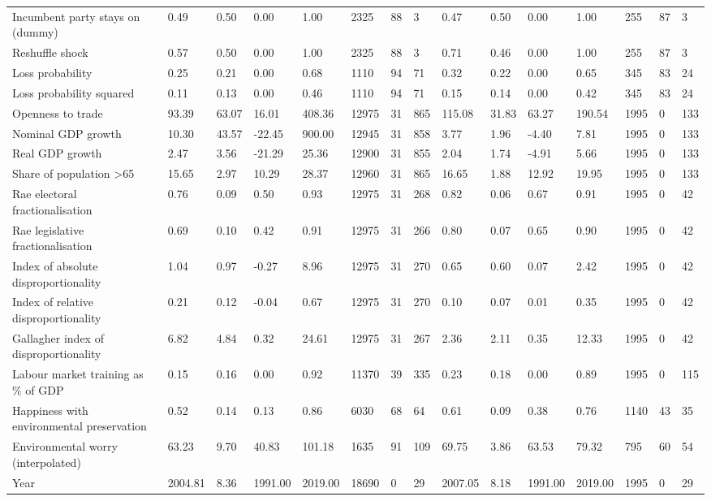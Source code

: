 \begin{longtable}{lllllllllllllll}
Incumbent party stays on (dummy) & 0.49 & 0.50 & 0.00 & 1.00 & 2325 & 88 & 3 & 0.47 & 0.50 & 0.00 & 1.00 & 255 & 87 & 3\\
Reshuffle shock & 0.57 & 0.50 & 0.00 & 1.00 & 2325 & 88 & 3 & 0.71 & 0.46 & 0.00 & 1.00 & 255 & 87 & 3\\
\addlinespace
Loss probability & 0.25 & 0.21 & 0.00 & 0.68 & 1110 & 94 & 71 & 0.32 & 0.22 & 0.00 & 0.65 & 345 & 83 & 24\\
Loss probability squared & 0.11 & 0.13 & 0.00 & 0.46 & 1110 & 94 & 71 & 0.15 & 0.14 & 0.00 & 0.42 & 345 & 83 & 24\\
Openness to trade & 93.39 & 63.07 & 16.01 & 408.36 & 12975 & 31 & 865 & 115.08 & 31.83 & 63.27 & 190.54 & 1995 & 0 & 133\\
Nominal GDP growth & 10.30 & 43.57 & -22.45 & 900.00 & 12945 & 31 & 858 & 3.77 & 1.96 & -4.40 & 7.81 & 1995 & 0 & 133\\
Real GDP growth & 2.47 & 3.56 & -21.29 & 25.36 & 12900 & 31 & 855 & 2.04 & 1.74 & -4.91 & 5.66 & 1995 & 0 & 133\\
\addlinespace
Share of population >65 & 15.65 & 2.97 & 10.29 & 28.37 & 12960 & 31 & 865 & 16.65 & 1.88 & 12.92 & 19.95 & 1995 & 0 & 133\\
Rae electoral fractionalisation & 0.76 & 0.09 & 0.50 & 0.93 & 12975 & 31 & 268 & 0.82 & 0.06 & 0.67 & 0.91 & 1995 & 0 & 42\\
Rae legislative fractionalisation & 0.69 & 0.10 & 0.42 & 0.91 & 12975 & 31 & 266 & 0.80 & 0.07 & 0.65 & 0.90 & 1995 & 0 & 42\\
Index of absolute disproportionality & 1.04 & 0.97 & -0.27 & 8.96 & 12975 & 31 & 270 & 0.65 & 0.60 & 0.07 & 2.42 & 1995 & 0 & 42\\
Index of relative disproportionality & 0.21 & 0.12 & -0.04 & 0.67 & 12975 & 31 & 270 & 0.10 & 0.07 & 0.01 & 0.35 & 1995 & 0 & 42\\
\addlinespace
Gallagher index of disproportionality & 6.82 & 4.84 & 0.32 & 24.61 & 12975 & 31 & 267 & 2.36 & 2.11 & 0.35 & 12.33 & 1995 & 0 & 42\\
Labour market training as \% of GDP & 0.15 & 0.16 & 0.00 & 0.92 & 11370 & 39 & 335 & 0.23 & 0.18 & 0.00 & 0.89 & 1995 & 0 & 115\\
Happiness with environmental preservation & 0.52 & 0.14 & 0.13 & 0.86 & 6030 & 68 & 64 & 0.61 & 0.09 & 0.38 & 0.76 & 1140 & 43 & 35\\
Environmental worry (interpolated) & 63.23 & 9.70 & 40.83 & 101.18 & 1635 & 91 & 109 & 69.75 & 3.86 & 63.53 & 79.32 & 795 & 60 & 54\\
Year & 2004.81 & 8.36 & 1991.00 & 2019.00 & 18690 & 0 & 29 & 2007.05 & 8.18 & 1991.00 & 2019.00 & 1995 & 0 & 29\\
\bottomrule
\end{longtable}
